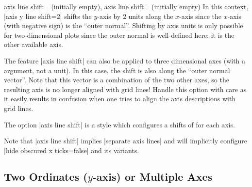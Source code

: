 \begin{pgfplotsxykeylist}{
    axis \x\space line shift= (initially empty), axis
    line shift= (initially empty)}
    In this context, |axis y line shift=2| shifts the $y$-axis by $2$ units
    along the $x$-axis since the $x$-axis (with negative sign) is the ``outer
    normal''. Shifting by axis units is only possible for two-dimensional plots
    since the outer normal is well-defined here: it is the other available
    axis.

    The feature |axis line shift| can also be applied to three dimensional axes
    (with a  argument, not a unit). In this case, the shift is
    also along the ``outer normal vector''. Note that this vector is a
    combination of the two other axes, so the resulting axis is no longer
    aligned with grid lines! Handle this option with care as it easily results
    in confusion when one tries to align the axis descriptions with grid lines.
\begin{codeexample}[]
\end{codeexample}

    The option |axis line shift| is a style which configures a shifts of
     for each axis.

    Note that |axis line shift| implies |separate axis lines| and will
    implicitly configure |hide obscured x ticks=false| and its
    variants.
\end{pgfplotsxykeylist}


\subsection[Two Ordinates]{Two Ordinates ($y$-axis) or Multiple Axes}

